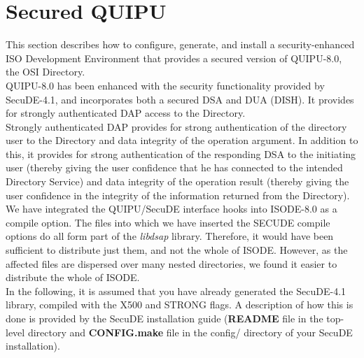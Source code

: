\section{Secured QUIPU}
This section describes how to configure, generate, and install
a security-enhanced ISO Development Environment that provides a secured version of
QUIPU-8.0, the OSI Directory. 
\\ [1em]
QUIPU-8.0 has been enhanced with the security functionality provided by SecuDE-4.1, and 
incorporates both a secured DSA and DUA (DISH). It provides for strongly authenticated DAP access
to the Directory.
\\ [1em]
Strongly authenticated DAP provides for strong authentication of the directory user
to the Directory and data integrity of the operation argument. In addition to this, it 
provides for strong authentication of the responding DSA to the initiating user
(thereby giving the user confidence that he has connected to the intended Directory Service)
and data integrity of the operation result (thereby giving the user confidence in the
integrity of the information returned from the Directory).
\\ [1em]
We have integrated the QUIPU/SecuDE interface hooks into ISODE-8.0 as a compile option.
The files into which we have inserted the SECUDE compile options do all form part
of the {\em libdsap} library. Therefore, it would have been sufficient to distribute
just them, and not the whole of ISODE. However, as the affected files are dispersed
over many nested directories, we found it easier to distribute the whole of ISODE.
\\ [1em]
In the following, it is assumed that you have already generated the SecuDE-4.1 library,
compiled with the X500 and STRONG flags. 
A description of how this is done is provided by the SecuDE installation guide
({\bf README} file in the top-level directory and {\bf CONFIG.make} file in the config/ directory of your SecuDE installation).


